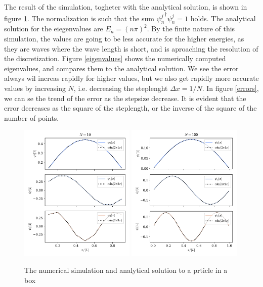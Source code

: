 \documentclass{article}
\begin{document}
    The result of the simulation, togheter with the analytical solution, is shown in figure \ref{fig:particel in box}. The normalization is such that the sum ${\psi_n^{j}}^\dagger\psi_n^{j} = 1$ holds. The analytical solution for the eiegenvalues are $E_n = (n \pi)^2$. By the finite nature of this simulation, the values are going to be less accurate for the higher energies, as they are waves where the wave length is short, and is aproaching the resolution of the discretization. Figure \ref{eigenvalues} shows the numerically computed eigenvalues, and compares them to the analytical solution. We see the error always wil increas rapidly for higher values, but we also get rapidly more accurate values by increasing $N$, i.e. decreasing the steplenght $\Delta x = 1 / N$. In figure \ref{errors}, we can se the trend of the error as the stepsize decrease. It is evident that the error decreases as the square of the steplength, or the inverse of the square of the number of points.

    \begin{figure}
        \centering
        \includegraphics[width=0.49\textwidth]{particle_in_box/vector_N=10}
        \includegraphics[width=0.49\textwidth]{particle_in_box/vector_N=100}
        \caption{The numerical simulation and analytical solution to a prticle in a box}
        \label{fig:particel in box}
    \end{figure}
\end{document}
